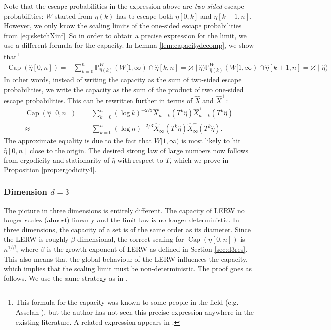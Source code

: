 \documentclass{article}
\DeclareMathOperator{\Ca}{Cap}
\renewcommand{\P}{\mathbb{P}}
\newcommand{\1}{\mathbf{1}}
\newcommand{\heta}{\hat\eta}
\theoremstyle{definition}
\numberwithin{equation}{section}
\numberwithin{theorem}{section}
\begin{document}
Note that the escape probabilities in the expression above are \emph{two-sided} escape probabilities: $W$ started from $\eta(k)$ has to escape both $\eta[0,k]$ and $\eta[k+1,n]$. However, we only know the scaling limits of the one-sided escape probabilities from \eqref{eq:sketchXinf}. So in order to obtain a precise expression for the limit, we use a different formula for the capacity. In Lemma \ref{lem:capacitydecomp}, we show that\footnote{This formula for the capacity was known to some people in the field (e.g. Asselah \cite{asselahprivate}), but the author has not seen this precise expression anywhere in the existing literature. A related expression appears in \cite{losev2023long}.}
\begin{equation}
	\begin{split}
		\Ca(\heta[0,n])
        =&\sum_{k=0}^n\P^W_{\heta(k)}(W[1,\infty)\cap\heta[k,n]=\varnothing\mid\heta)\P^W_{\heta(k)}(W[1,\infty)\cap\heta[k+1,n]=\varnothing\mid\heta)
	\end{split}
\end{equation}
In other words, instead of writing the capacity as the sum of two-sided escape probabilities, we write the capacity as the sum of the product of two one-sided escape probabilities. This can be rewritten further in terms of $\hat{X}$ and $\hat{X}^+$:
\begin{equation}
	\begin{split}
		\Ca(\heta[0,n])=&\sum_{k=0}^n(\log k)^{-2/3}\hat{X}_{n-k}(T^k\heta)\hat{X}_{n-k}^+(T^k\heta)\\
		\approx&\sum_{k=0}^n(\log n)^{-2/3}\hat{X}_{\infty}(T^k\heta)\hat{X}_{\infty}^+(T^k\heta).
	\end{split}
\end{equation}
The approximate equality is due to the fact that $W[1,\infty)$ is most likely to hit $\heta[0,n]$ close to the origin. The desired strong law of large numbers now follows from ergodicity and stationarity of $\heta$ with respect to $T$, which we prove in Proposition \ref{prop:ergodicity4}.

\subsubsection{Dimension \texorpdfstring{$d=3$}{d=3}}
The picture in three dimensions is entirely different. The capacity of LERW no longer scales (almost) linearly and the limit law is no longer deterministic. In three dimensions, the capacity of a set is of the same order as its diameter. Since the LERW is roughly $\beta$-dimensional, the correct scaling for $\Ca(\eta[0,n])$ is $n^{1/\beta}$, where $\beta$ is the growth exponent of LERW as defined in Section \ref{sec:d3res}. This also means that the global behaviour of the LERW influences the capacity, which implies that the scaling limit must be non-deterministic. The proof goes as follows. We use the same strategy as in \cite{chang17two}.
\end{document}
